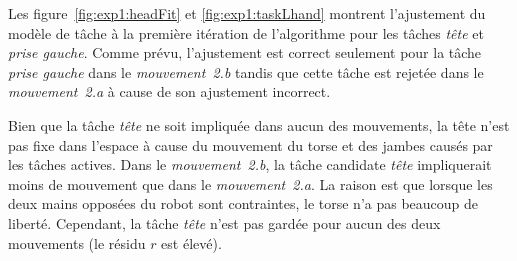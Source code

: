 Les figure~\ref{fig:exp1:headFit} et \ref{fig:exp1:taskLhand} montrent l'ajustement
du modèle de t\^ache à la première itération de l'algorithme pour les t\^aches \emph{tête} et \emph{prise gauche}. 
Comme prévu, l'ajustement est correct seulement pour la t\^ache 
\emph{prise gauche} dans le \emph{mouvement~2.b} tandis que cette t\^ache est rejetée dans
le \emph{mouvement~2.a} à cause de son ajustement incorrect.
\begin{figure*}[t]
  \centering
  \subfigure[Mouvement 2.a]{
  \resizebox{.48\textwidth}{!} {
  
  }
  \label{fig:exp1:headFit:R}
  }
  \subfigure[Mouvement 2.b]{
  \resizebox{.48\textwidth}{!} {
  
  }
  \label{fig:exp1:headFit:RL}
  }
  \caption[T\^ache non sélectionnée.]{Ajustement des modèles de t\^ache à la première itération de l'algorithme de sélection de
  t\^aches pour les t\^aches \emph{tête} dans le \emph{mouvement~2.a} et \emph{mouvement~2.b} 
  Pour les deux mouvements, $r$ est élevé: la t\^ache \emph{tête}, qui n'est pas active, n'est
  pas sélectionnée.}
  \label{fig:exp1:headFit}
\end{figure*}
\begin{figure*}[t]
  \centering
  \subfigure[Mouvement 2.a]{
  \resizebox{.48\textwidth}{!} {
  
  }                           
  \label{fig:exp1:taskLhand:R}
  }
  \subfigure[Mouvement 2.b]{
  \resizebox{.48\textwidth}{!} {
  
  }
  \label{fig:exp1:taskLhand:RL}
  }
  \caption[La t\^ache \emph{prise gauche} n'est pas pertinente dans le \emph{mouvement~2.a}.]{Ajustement des modèles de t\^ache à la première itération de l'algorithme de sélection de t\^aches
  pour la t\^ache \emph{prise gauche} dans le \emph{mouvement~2.a} et \emph{mouvement~2.b} 
  La t\^ache \emph{prise gauche} n'est pas pertinente dans le \emph{mouvement~2.a}, 
  mais est sélectionnée dans le \emph{mouvement~2.b}.}
  \label{fig:exp1:taskLhand}
\end{figure*}

Bien que la t\^ache \emph{tête} ne soit impliquée dans aucun des mouvements,
la tête n'est pas fixe dans l'espace à cause du mouvement 
du torse et des jambes causés par les t\^aches actives.
Dans le \emph{mouvement~2.b}, la t\^ache candidate \emph{t\^ete} impliquerait moins de mouvement 
que dans le \emph{mouvement~2.a}. La raison est que lorsque les deux 
mains opposées du robot sont contraintes, le torse n'a pas beaucoup de liberté. 
Cependant, la t\^ache \emph{tête} n'est pas gardée pour aucun des deux mouvements (le résidu $r$ est élevé).

